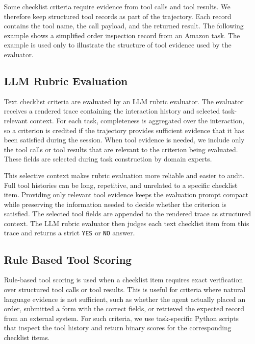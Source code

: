 Some checklist criteria require evidence from tool calls and tool results. We therefore keep structured tool records as part of the trajectory. Each record contains the tool name, the call payload, and the returned result. The following example shows a simplified order inspection record from an Amazon task. The example is used only to illustrate the structure of tool evidence used by the evaluator.



\subsection{LLM Rubric Evaluation}
\label{app:eval_rubric_tool_context}

Text checklist criteria are evaluated by an LLM rubric evaluator. The evaluator receives a rendered trace containing the interaction history and selected task-relevant context.
For each task, completeness is aggregated over the interaction, so a criterion is credited if the trajectory provides sufficient evidence that it has been satisfied during the session.
When tool evidence is needed, we include only the tool calls or tool results that are relevant to the criterion being evaluated. These fields are selected during task construction by domain experts.

This selective context makes rubric evaluation more reliable and easier to audit. Full tool histories can be long, repetitive, and unrelated to a specific checklist item. Providing only relevant tool evidence keeps the evaluation prompt compact while preserving the information needed to decide whether the criterion is satisfied. The selected tool fields are appended to the rendered trace as structured context. The LLM rubric evaluator then judges each text checklist item from this trace and returns a strict \texttt{YES} or \texttt{NO} answer.



\subsection{Rule Based Tool Scoring}
\label{app:eval_rule_based}

Rule-based tool scoring is used when a checklist item requires exact verification over structured tool calls or tool results. This is useful for criteria where natural language evidence is not sufficient, such as whether the agent actually placed an order, submitted a form with the correct fields, or retrieved the expected record from an external system. For such criteria, we use task-specific Python scripts that inspect the tool history and return binary scores for the corresponding checklist items.


